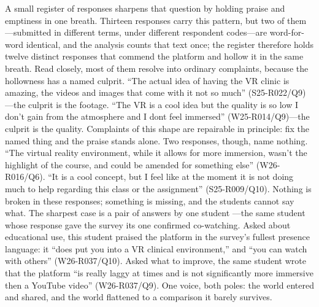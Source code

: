 A small register of responses sharpens that question by holding praise
and emptiness in one breath. Thirteen responses carry this pattern,
but two of them---submitted in different terms, under different
respondent codes---are word-for-word identical, and the analysis
counts that text once; the register therefore holds twelve distinct
responses that commend the platform and hollow it in the same breath. Read closely, most of them resolve
into ordinary complaints, because the hollowness has a named culprit.
``The actual idea of having the VR clinic is amazing, the videos and
images that come with it not so much'' (S25-R022/Q9)---the culprit is
the footage. ``The VR is a cool idea but the quality is so low I don't
gain from the atmosphere and I dont feel immersed'' (W25-R014/Q9)---the
culprit is the quality. Complaints of this shape are repairable in
principle: fix the named thing and the praise stands alone. Two
responses, though, name nothing. ``The virtual reality environment,
while it allows for more immersion, wasn't the highlight of the course,
and could be amended for something else'' (W26-R016/Q6). ``It is a cool
concept, but I feel like at the moment it is not doing much to help
regarding this class or the assignment'' (S25-R009/Q10). Nothing is
broken in these responses; something is missing, and the students
cannot say what. The sharpest case is a pair of answers by one student
---the same student whose response gave the survey its one confirmed
co-watching. Asked about educational use, this student praised the
platform in the survey's fullest presence language: it ``does put you
into a VR clinical environment,'' and ``you can watch with others''
(W26-R037/Q10). Asked what to improve, the same student wrote that the
platform ``is really laggy at times and is not significantly more
immersive then a YouTube video'' (W26-R037/Q9). One voice, both poles:
the world entered and shared, and the world flattened to a comparison
it barely survives.

